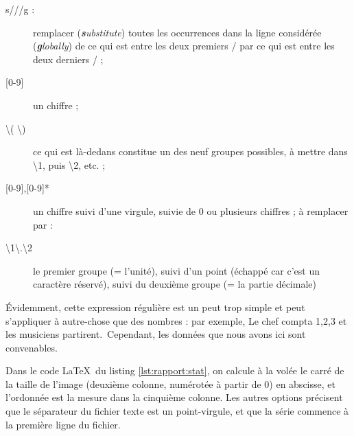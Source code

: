 \begin{description}
\item[s///g :] remplacer (\emph{\textbf{s}ubstitute}) toutes les
  occurrences dans la ligne considérée (\emph{\textbf{g}lobally}) de
  ce qui est entre les deux premiers / par ce qui est entre les deux
  derniers / ;
\item[{[0-9]}] un chiffre ;
\item[\textbackslash ( \textbackslash )] ce qui est
  là-dedans constitue un des neuf groupes possibles, à mettre dans
  \textbackslash 1, puis \textbackslash 2, etc. ;
\item[{[0-9],[0-9]*}] un chiffre suivi
  d'une virgule, suivie de 0 ou plusieurs chiffres ; à remplacer par :
\item[\textbackslash 1\textbackslash .\textbackslash 2] le premier
  groupe (= l'unité), suivi d'un point (échappé car c'est un caractère
  réservé), suivi du deuxième groupe (= la partie décimale)
\end{description}

Évidemment, cette expression régulière est un peut trop simple et peut
s'appliquer à autre-chose que des nombres : par exemple, \og Le chef
compta 1,2,3 et les musiciens partirent.\fg\ Cependant, les données
que nous avons ici sont convenables.

Dans le code \LaTeX\ du listing \ref{lst:rapport:stat}, on calcule à
la volée le carré de la taille de l'image (deuxième colonne, numérotée
à partir de 0) en abscisse, et l'ordonnée est la mesure dans la
cinquième colonne. Les autres options précisent que le séparateur du
fichier texte est un point-virgule, et que la série commence à la
première ligne du fichier.



